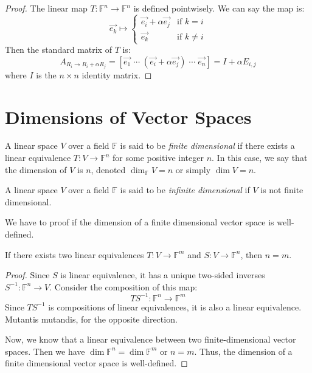 \documentclass[
	11pt, %
	fleqn, %
	a4paper, %
]{LegrandOrangeBook}
\newcommand{\F}{\mathbb{F}} %
\begin{document}
\begin{proof}
    The linear map $T: \F^n \to \F^n$ is defined pointwisely. We can say the map is:
    \[
        \vec{e_k} \mapsto \begin{cases}
            \vec{e_i} + \alpha \vec{e_j} & \text{if } k = i \\
            \vec{e_k} & \text{if } k \neq i
        \end{cases}
    \]
    Then the standard matrix of $T$ is:
    \[
        A_{R_i \to R_i + \alpha R_j} = [\vec{e_1} \; \cdots \; (\vec{e_i} + \alpha\vec{e_j}) \; \cdots \; \vec{e_n}] = I + \alpha E_{i,j}
    \]
    where $I$ is the $n \times n$ identity matrix.
\end{proof}

\newpage

\section{Dimensions of Vector Spaces}

\begin{definition} \label{def:finite_dimensional_vector_space}
    A linear space $V$ over a field $\F$ is said to be \emph{finite dimensional} if there exists a linear equivalence $T: V \to \F^n$ for some positive integer $n$. In this case, we say that the dimension of $V$ is $n$, denoted $\dim_{\F} V = n$ or simply $\dim V = n$.
\end{definition}

\begin{definition}
    A linear space $V$ over a field $\F$ is said to be \emph{infinite dimensional} if $V$ is not finite dimensional.
\end{definition}

We have to proof if the dimension of a finite dimensional vector space is well-defined.

\begin{proposition}
    If there exists two linear equivalences $T: V \to \F^m$ and $S: V \to \F^n$, then $n = m$.
\end{proposition}

\begin{proof}
    Since $S$ is linear equivalence, it has a unique two-sided inverses $S^{-1}: \F^n \to V$. Consider the composition of this map:
    \[
        TS^{-1}: \F^n \to \F^m
    \]
    Since $TS^{-1}$ is compositions of linear equivalences, it is also a linear equivalence. Mutantis mutandis, for the opposite direction.

    Now, we know that a linear equivalence between two finite-dimensional vector spaces. Then we have $\dim \F^n = \dim \F^m$ or $n = m$. Thus, the dimension of a finite dimensional vector space is well-defined.
\end{proof}
\end{document}
